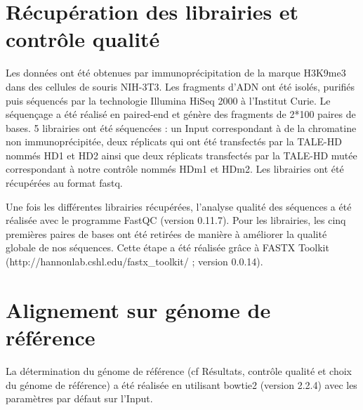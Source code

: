 \documentclass[a4paper,12pt,times]{report}
\begin{document}
\setcounter{section}{0}

  
    \section{Récupération des librairies et contrôle qualité}
    
    Les données ont été obtenues par immunoprécipitation de  la marque H3K9me3 dans des cellules de souris NIH-3T3. Les fragments d'ADN ont été isolés, purifiés puis séquencés par la technologie Illumina HiSeq 2000 à l'Institut Curie. Le séquençage a été réalisé en paired-end et génère des fragments de 2*100 paires de bases.
5 librairies ont été séquencées : un Input correspondant à de la chromatine non immunoprécipitée, deux réplicats qui ont été transfectés par la TALE-HD nommés HD1 et HD2 ainsi que deux réplicats  transfectés par la TALE-HD mutée correspondant à notre contrôle nommés HDm1 et HDm2. Les librairies ont été récupérées au format fastq.

\bigskip
Une fois les différentes librairies récupérées, l’analyse qualité des séquences a été réalisée avec le programme FastQC \cite{fastqc} (version 0.11.7). 
Pour les librairies, les cinq premières paires de bases  ont été retirées de manière à améliorer la qualité globale de nos séquences. Cette étape a été réalisée grâce à FASTX Toolkit (http://hannonlab.cshl.edu/fastx\_toolkit/ ; version 0.0.14).
    
    
    \section{Alignement sur génome de référence}
    
    La détermination du génome de référence (cf Résultats, contrôle qualité et choix du génome de référence) a été réalisée en utilisant bowtie2 \cite{bowtie}(version 2.2.4) avec les paramètres par défaut sur l'Input. 
    
\end{document}
